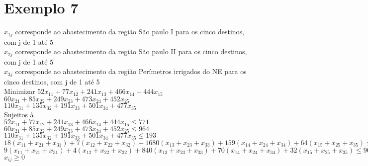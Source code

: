 \documentclass[a4paper,oneside]{article}
\begin{document}
\section*{Exemplo 7}

\begin{center}
$x_{1j}$ corresponde ao abastecimento da região São paulo I para os cinco destinos, com j de 1 até 5\\
$x_{2j}$ corresponde ao abastecimento da região São paulo II para os cinco destinos, com j de 1 até 5\\
$x_{3j}$ corresponde ao abastecimento da região Perímetros irrigados do NE para os cinco destinos, com j de 1 até 5\\
  Minimizar  $52x_{11} + 77x_{12} + 241x_{13} + 466x_{14} + 444x_{15}$ \\
   $60x_{21} + 85x_{22} + 249x_{23} + 473x_{24} + 452x_{25}$ \\
    $110x_{31} + 135x_{32} + 191x_{33} + 501x_{34} + 477x_{35}$ \\
  Sujeitos à \\
  $52x_{11} + 77x_{12} + 241x_{13} + 466x_{14} + 444x_{15} \leq 771$ \\
  $60x_{21} + 85x_{22} + 249x_{23} + 473x_{24} + 452x_{25} \leq 964$ \\
  $110x_{31} + 135x_{32} + 191x_{33} + 501x_{34} + 477x_{35} \leq 193$ \\
  $18(x_{11} + x_{21} + x_{31}) + 7(x_{12} + x_{22} + x_{32}) + 1680(x_{13} + x_{23} + x_{33}) + 159(x_{14} + x_{24} + x_{34}) + 64(x_{15} + x_{25} + x_{35}) \leq 1928$ \\
  $9(x_{11} + x_{21} + x_{31}) + 4(x_{12} + x_{22} + x_{32}) + 840(x_{13} + x_{23} + x_{33}) + 70(x_{14} + x_{24} + x_{34})  + 32(x_{15} + x_{25} + x_{35})\leq 964$ \\
  $x_{ij} \geq 0$\\
  
    
\end{center}
\end{document}

